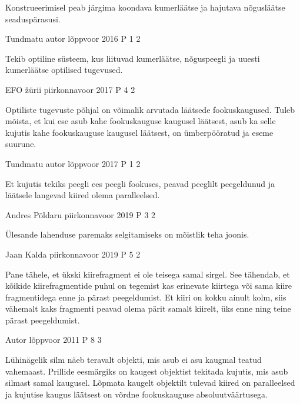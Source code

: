 \documentclass[11pt]{article}
\begin{document}
{{\ifHint
Konstrueerimisel peab järgima koondava kumerläätse ja hajutava nõgusläätse seaduspärasusi.
\fi
}
 


{Tundmatu autor} %
{lõppvoor} %
{2016} %
{P 1} %
{2} %
{

\ifHint
Tekib optiline süsteem, kus liituvad kumerläätse, nõguspeegli ja uuesti kumerläätse optilised tugevused.
\fi
}


{EFO žürii} %
{piirkonnavoor} %
{2017} %
{P 4} %
{2} %
{

\ifHint
Optiliste tugevuste põhjal on võimalik arvutada läätsede fookuskaugused. Tuleb mõista, et kui ese asub kahe fookuskauguse kaugusel läätsest, asub ka selle kujutis kahe fookuskauguse kaugusel läätsest, on ümberpööratud ja eseme suurune.
\fi
}


{Tundmatu autor} %
{lõppvoor} %
{2017} %
{P 1} %
{2} %
{

\ifHint
Et kujutis tekiks peegli ees peegli fookuses, peavad peeglilt peegeldunud ja läätsele langevad kiired olema paralleelsed.
\fi
}


{Andres Põldaru} %
{piirkonnavoor} %
{2019} %
{P 3} %
{2} %
{

\ifHint
Ülesande lahenduse paremaks selgitamiseks on mõistlik teha joonis.
\fi
}


{Jaan Kalda} %
{piirkonnavoor} %
{2019} %
{P 5} %
{2} %
{

\ifHint
Pane tähele, et ükski kiirefragment ei ole teisega samal sirgel. See tähendab, et kõikide kiirefragmentide puhul on tegemist kas erinevate kiirtega või sama kiire fragmentidega enne ja pärast peegeldumist. Et kiiri on kokku ainult kolm, siis vähemalt kaks fragmenti peavad olema pärit samalt kiirelt, üks enne ning teine pärast peegeldumist. 
\fi
}


{Autor} %
{lõppvoor} %
{2011} %
{P 8} %
{3} %
{

\ifHint
Lühinägelik silm näeb teravalt objekti, mis asub ei asu kaugmal teatud vahemaast. Prillide eesmärgiks on kaugest objektist tekitada kujutis, mis asub silmast samal kaugusel. Lõpmata kaugelt objektilt tulevad kiired on paralleelsed ja kujutise kaugus läätsest on võrdne fookuskauguse absoluutväärtusega.
\fi
}


}
\end{document}
